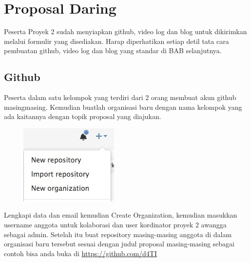 \section{Proposal Daring}
Peserta	 Proyek	 2	 sudah	menyiapkan	github,	 video	log	 dan	 blog	 untuk	 dikirimkan	melalui	formulir	 yang	 disediakan.	 Harap	 diperhatikan	 setiap	 detil	 tata	 cara	 pembuatan	 github,	 video	log	dan	blog	yang	standar	di	BAB	selanjutnya.

\subsection{Github}
Peserta	 dalam	 satu	 kelompok	 yang	 terdiri	 dari	 2	 orang	membuat	 akun	 github	 masingmasing.	 Kemudian	 buatlah organisasi	 baru	 dengan	 nama	 kelompok	 yang	 ada	 kaitannya	
dengan	topik	proposal	yang	diajukan.


\begin{figure}[H]
    \centering
    \includegraphics[scale=0.7]{figures/git.jpg}
    \label{git}
\end{figure}

Lengkapi	 data	 dan	 email	 kemudian	 Create	 Organization,	 kemudian	 masukkan	 username	anggota	untuk	kolaborasi dan	user	kordinator	proyek	2	awangga	sebagai	admin.	Setelah	itu	buat repository	 masing-masing	 anggota	 di	 dalam	 organisasi	 baru	 tersebut	 sesuai	 dengan	judul	proposal	masing-masing	sebagai	contoh	bisa	anda	buka	di \url{https://github.com/d4TI}

